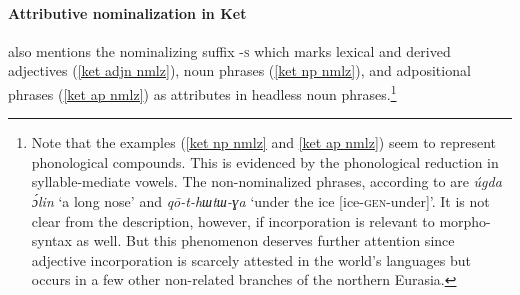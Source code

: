 \paragraph{Attributive nominalization in Ket}
\citet[15, 84–85]{vajda2004} also mentions the nominalizing suffix \textsc{-s} which marks lexical and derived adjectives (\ref{ket adjn nmlz}), noun phrases (\ref{ket np nmlz}), and adpositional phrases (\ref{ket ap nmlz}) as attributes in headless noun phrases.\footnote{Note that the examples (\ref{ket np nmlz} and \ref{ket ap nmlz}) seem to represent phonological compounds. This is evidenced by the phonological reduction in syllable-mediate vowels. The non-nominalized phrases, according to \citet{vajda2005} are \textit{úgda ɔ́lin} ‘a long nose’ and \textit{qō-t-hɯtɯ-ɣa} ‘under the ice [ice-\textsc{gen}-under]’. It is not clear from the description, however, if incorporation is relevant to morpho-syntax as well. But this phenomenon deserves further attention since adjective incorporation is scarcely attested in the world's languages but occurs in a few other non-related branches of the northern Eurasia.}

